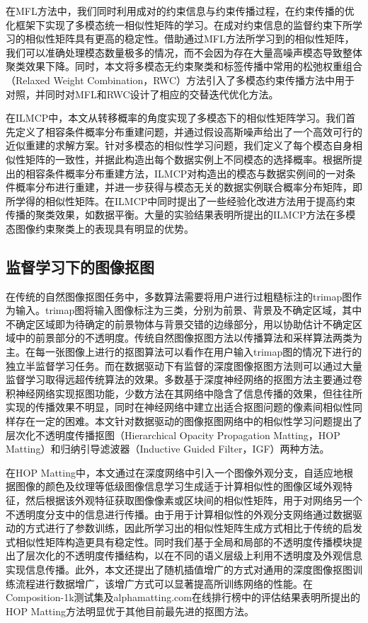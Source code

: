 在MFL方法中，我们同时利用成对的约束信息与约束传播过程，在约束传播的优化框架下实现了多模态统一相似性矩阵的学习。在成对约束信息的监督约束下所学习的相似性矩阵具有更高的稳定性。借助通过MFL方法所学习到的相似性矩阵，我们可以准确处理模态数量极多的情况，而不会因为存在大量高噪声模态导致整体聚类效果下降。同时，本文将多模态无约束聚类和标签传播中常用的松弛权重组合（Relaxed Weight Combination，RWC）方法引入了多模态约束传播方法中用于对照，并同时对MFL和RWC设计了相应的交替迭代优化方法。

在ILMCP中，本文从转移概率的角度实现了多模态下的相似性矩阵学习。我们首先定义了相容条件概率分布重建问题，并通过假设高斯噪声给出了一个高效可行的近似重建的求解方案。针对多模态的相似性学习问题，我们定义了每个模态自身相似性矩阵的一致性，并据此构造出每个数据实例上不同模态的选择概率。根据所提出的相容条件概率分布重建方法，ILMCP对构造出的模态与数据实例间的一对条件概率分布进行重建，并进一步获得与模态无关的数据实例联合概率分布矩阵，即所学得的相似性矩阵。在ILMCP中同时提出了一些经验化改进方法用于提高约束传播的聚类效果，如数据平衡。大量的实验结果表明所提出的ILMCP方法在多模态图像约束聚类上的表现具有明显的优势。

\subsection{监督学习下的图像抠图}
在传统的自然图像抠图任务中，多数算法需要将用户进行过粗糙标注的trimap图作为输入。trimap图将输入图像标注为三类，分别为前景、背景及不确定区域，其中不确定区域即为待确定的前景物体与背景交错的边缘部分，用以协助估计不确定区域中的前景部分的不透明度。传统自然图像抠图方法以传播算法和采样算法两类为主。在每一张图像上进行的抠图算法可以看作在用户输入trimap图的情况下进行的独立半监督学习任务。而在数据驱动下有监督的深度图像抠图方法则可以通过大量监督学习取得远超传统算法的效果。多数基于深度神经网络的抠图方法主要通过卷积神经网络实现抠图功能，少数方法在其网络中隐含了信息传播的效果\cite{samplenet,cai2019disentangled}，但往往所实现的传播效果不明显，同时在神经网络中建立出适合抠图问题的像素间相似性同样存在一定的困难。本文针对数据驱动的图像抠图网络中的相似性学习问题提出了层次化不透明度传播抠图（Hierarchical Opacity Propagation Matting，HOP Matting）和归纳引导滤波器（Inductive Guided Filter，IGF）两种方法。

在HOP Matting中，本文通过在深度网络中引入一个图像外观分支，自适应地根据图像的颜色及纹理等低级图像信息学习生成适于计算相似性的图像区域外观特征，然后根据该外观特征获取图像像素或区块间的相似性矩阵，用于对网络另一个不透明度分支中的信息进行传播。由于用于计算相似性的外观分支网络通过数据驱动的方式进行了参数训练，因此所学习出的相似性矩阵生成方式相比于传统的启发式相似性矩阵构造更具有稳定性。同时我们基于全局和局部的不透明度传播模块提出了层次化的不透明度传播结构，以在不同的语义层级上利用不透明度及外观信息实现信息传播。此外，本文还提出了随机插值增广的方式对通用的深度图像抠图训练流程进行数据增广，该增广方式可以显著提高所训练网络的性能。在Composition-1k测试集\cite{xu2017deep}及alphamatting.com在线排行榜\cite{rhemann2009perceptually}中的评估结果表明所提出的HOP Matting方法明显优于其他目前最先进的抠图方法。

